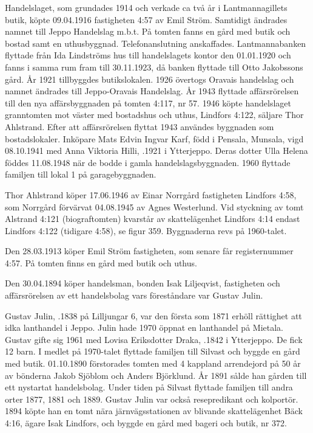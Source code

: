 

Handelslaget, som grundades 1914 och verkade ca två år i Lantmannagillets butik, köpte 09.04.1916 fastigheten 4:57 av Emil Ström.	Samtidigt ändrades namnet till Jeppo Handelslag m.b.t. På tomten fanns en gård med butik och bostad samt en uthusbyggnad. Telefonanslutning anskaffades. Lantmannabanken flyttade från Ida Lindströms	hus till handelslagets kontor den 01.01.1920 och fanns i samma rum fram	till 30.11.1923, då banken flyttade till Otto Jakobssons gård. År 1921 	tillbyggdes butikslokalen. 1926 övertogs Oravais handelslag och	namnet ändrades till Jeppo-Oravais Handelslag. År 1943 flyttade 	affärsrörelsen till den nya affärsbyggnaden på tomten 4:117, nr 57.	1946 köpte handelslaget granntomten mot väster med bostadshus och uthus, Lindfors 4:122, säljare Thor Ahlstrand.
Efter att affärsrörelsen flyttat 1943 användes byggnaden som bostadslokaler. Inköpare Mats Edvin Ingvar Karf, född i Pensala, Munsala, vigd 08.10.1941 med Anna Viktoria Hilli, .1921 i Ytterjeppo. Deras dotter Ulla Helena föddes 11.08.1948 när de bodde i 	gamla handelslagsbyggnaden. 1960 flyttade familjen till lokal 1 på 	garagebyggnaden.


Thor Ahlstrand köper 17.06.1946 av Einar Norrgård fastigheten	Lindfors 4:58, som Norrgård förvärvat 04.08.1945 av Agnes 	Westerlund.	Vid styckning av tomt Alstrand 4:121 (biograftomten) 	kvarstår av skattelägenhet Lindfors 4:14 endast Lindfors 4:122 (tidigare 4:58), se figur 359. Byggnaderna revs på 1960-talet.


Den 28.03.1913 köper Emil Ström fastigheten, som senare får	registernummer 4:57. På tomten finns en gård med butik och uthus.


Den 30.04.1894 köper handelsman, bonden Isak Liljeqvist, fastigheten och affärsrörelsen av ett handelsbolag vars föreståndare var Gustav Julin.


Gustav Julin, .1838 på Lilljungar 6, var den första som	1871 erhöll rättighet att idka lanthandel i Jeppo. Julin hade 1970 öppnat	en lanthandel på Mietala. Gustav gifte sig 1961 med Lovisa Eriksdotter Draka, .1842 i Ytterjeppo. De fick 12 barn. I medlet på 1970-talet flyttade familjen till Silvast och byggde en gård med butik. 01.10.1890 förstorades tomten med 4 kappland arrendejord på 50 år av bönderna Jakob Sjöblom och Anders Björklund. År 1891 sålde han gården till ett nystartat handelsbolag. Under tiden på Silvast flyttade familjen till andra orter 1877, 1881 och 1889. Gustav Julin var också resepredikant och kolportör. 1894 köpte han en tomt nära järnvägsstationen av blivande skattelägenhet Bäck 4:16, ägare Isak Lindfors, och byggde en gård med bageri och butik, nr 372.



